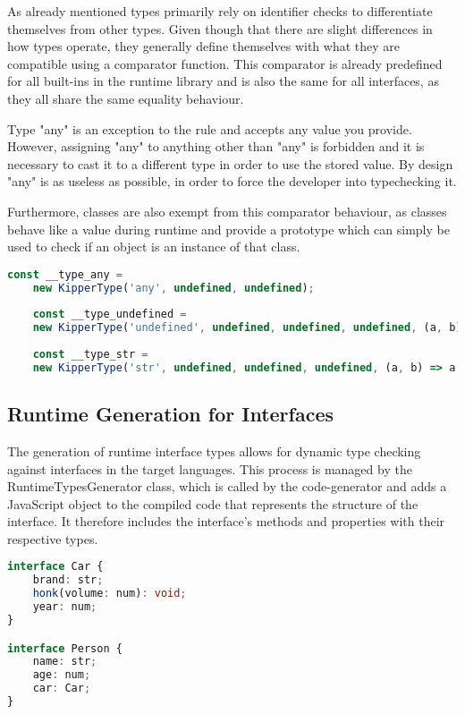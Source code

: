 As already mentioned types primarily rely on identifier checks to differentiate themselves from other types. Given though that there are slight differences in how types operate, they generally define themselves with what they are compatible using a comparator function. This comparator is already predefined for all built-ins in the runtime library and is also the same for all interfaces, as they all share the same equality behaviour.

Type "any" is an exception to the rule and accepts any value you provide. However, assigning "any" to anything other than "any" is forbidden and it is necessary to cast it to a different type in order to use the stored value. By design "any" is as useless as possible, in order to force the developer into typechecking it.

Furthermore, classes are also exempt from this comparator behaviour, as classes behave like a value during runtime and provide a prototype which can simply be used to check if an object is an instance of that class.

\begin{lstlisting}[language=TypeScript,caption=Examples for the builtin runtime types,label=lst:implementation:builtinruntimetypes]
	const __type_any = 
	new KipperType('any', undefined, undefined);
	
	const __type_undefined = 
	new KipperType('undefined', undefined, undefined, undefined, (a, b) => a.name === b.name);
	
	const __type_str = 
	new KipperType('str', undefined, undefined, undefined, (a, b) => a.name === b.name);
\end{lstlisting}

\subsection{Runtime Generation for Interfaces}

The generation of runtime interface types allows for dynamic type checking against interfaces in the target languages. This process is managed by the RuntimeTypesGenerator class, which is called by the code-generator and adds a JavaScript object to the compiled code that represents the structure of the interface. It therefore includes the interface's methods and properties with their respective types.

\begin{lstlisting}[language=Typescript,caption=Example interfaces in the Kipper language,label=lst:implementation:inputinterface]
interface Car {
	brand: str;
	honk(volume: num): void;
	year: num;
}

interface Person {
	name: str;
	age: num;
	car: Car;
}
\end{lstlisting}

